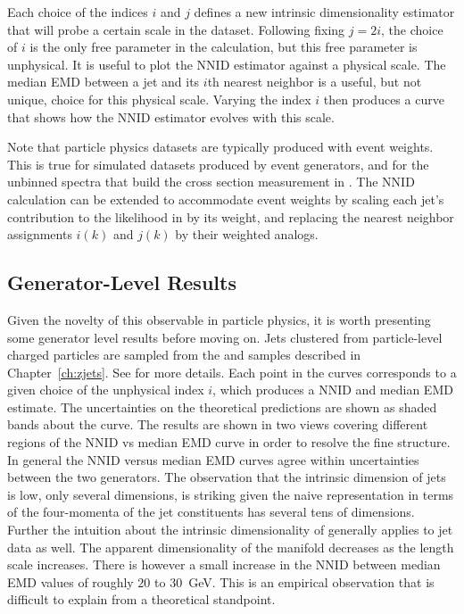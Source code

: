 Each choice of the indices $i$ and $j$ defines a new intrinsic dimensionality estimator that will probe a certain scale in the dataset.
Following fixing $j = 2i$, the choice of $i$ is the only free parameter in the calculation, but this free parameter is unphysical.
It is useful to plot the NNID estimator against a physical scale.
The median EMD between a jet and its $i$th nearest neighbor is a useful, but not unique, choice for this physical scale.
Varying the index $i$ then produces a curve that shows how the NNID estimator evolves with this scale.

Note that particle physics datasets are typically produced with event weights.
This is true for simulated datasets produced by event generators, and for the unbinned spectra that build the cross section measurement in .
The NNID calculation can be extended to accommodate event weights by scaling each jet's contribution to the likelihood in  by its weight, and replacing the nearest neighbor assignments $i(k)$ and $j(k)$ by their weighted analogs.

\subsection{Generator-Level Results}

Given the novelty of this observable in particle physics, it is worth presenting some generator level results before moving on.
Jets clustered from particle-level charged particles are sampled from the \mgpy and \sherpa samples described in Chapter~\ref{ch:zjets}.
See  for more details.
Each point in the curves corresponds to a given choice of the unphysical index $i$, which produces a NNID and median EMD estimate.
The uncertainties on the theoretical predictions are shown as shaded bands about the curve.
The results are shown in two views covering different regions of the NNID vs median EMD curve in order to resolve the fine structure.
In general the NNID versus median EMD curves agree within uncertainties between the two generators.
The observation that the intrinsic dimension of jets is low, only several dimensions, is striking given the naive representation in terms of the four-momenta of the jet constituents has several tens of dimensions.
Further the intuition about the intrinsic dimensionality of  generally applies to jet data as well.
The apparent dimensionality of the manifold decreases as the length scale increases.
There is however a small increase in the NNID between median EMD values of roughly $20$ to $30$~GeV.
This is an empirical observation that is difficult to explain from a theoretical standpoint.


